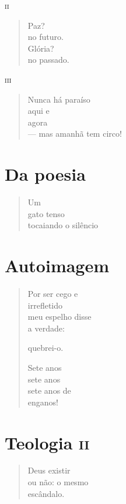 \medskip
\textsc{ii}

\begin{verse}
Paz?\\
no futuro.\\
Glória?\\
no passado.
\end{verse}

\medskip
\textsc{iii}

\begin{verse}
Nunca há paraíso\\
aqui e\\
agora\\
--- mas amanhã tem circo!
\end{verse}


\chapter{Da poesia}

\begin{verse}
Um\\
gato tenso\\
tocaiando o silêncio
\end{verse}

\chapter{Autoimagem}

\begin{verse}
Por ser cego e\\
irrefletido\\
meu espelho disse\\
a verdade:

quebrei-o.

Sete anos\\
sete anos\\
sete anos de\\
enganos!
\end{verse}

\chapter{Teologia \textsc{ii}}

\begin{verse}
Deus existir\\
ou não: o mesmo\\
escândalo.
\end{verse}
